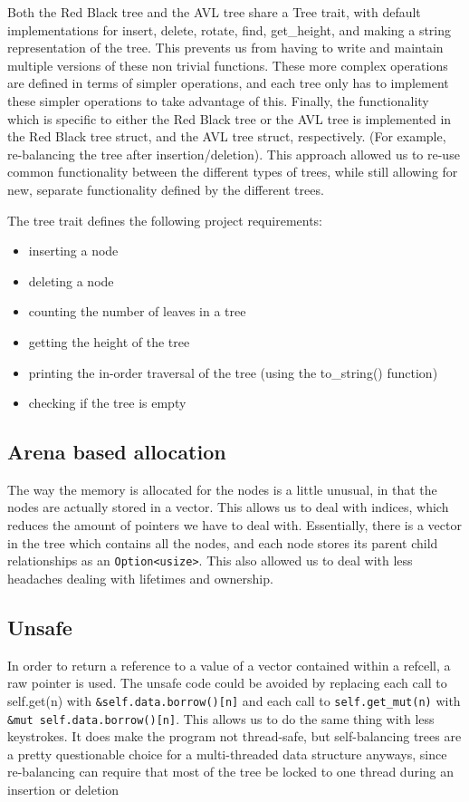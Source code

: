 \documentclass[letterpaper]{article}
\begin{document}
Both the Red Black tree and the AVL tree share a Tree trait, with
default implementations for insert, delete, rotate, find, get\_height,
and making a string representation of the tree. This prevents us from
having to write and maintain multiple versions of these non trivial
functions. These more complex operations are defined in terms of
simpler operations, and each tree only has to implement these simpler
operations to take advantage of this. Finally, the functionality which is
specific to either the Red Black tree or the AVL tree is implemented
in the Red Black tree struct, and the AVL tree struct, respectively.
(For example, re-balancing the tree after insertion/deletion).  This
approach allowed us to re-use common functionality between the
different types of trees, while still allowing for new, separate
functionality defined by the different trees.

The tree trait defines the following project requirements:

\begin{itemize}
  \item inserting a node 
  \item deleting a node
  \item counting the number of leaves in a tree
  \item getting the height of the tree
  \item printing the in-order traversal of the tree (using the to\_string()
    function)
  \item checking if the tree is empty
\end{itemize}

\subsection{Arena based allocation}
The way the memory is allocated for the nodes is a little unusual, in that the
nodes are actually stored in a vector. This allows us to deal with indices,
which reduces the amount of pointers we have to deal with. Essentially, there is
a vector in the tree which contains all the nodes, and each node stores its
parent child relationships as an \texttt{Option<usize>}. This also allowed us to
deal with less headaches dealing with lifetimes and ownership.

\subsection{Unsafe}
In order to return a reference to a value of a vector contained within a
refcell, a raw pointer is used. The unsafe code could be avoided by replacing
each call to self.get(n) with \texttt{\&self.data.borrow()[n]} and each call to
\texttt{self.get\_mut(n)} with \texttt{\&mut self.data.borrow()[n]}. This allows
us to do the same thing with less keystrokes. It does make the program not
thread-safe, but self-balancing trees are a pretty questionable choice for a
multi-threaded data structure anyways, since re-balancing can require that most
of the tree be locked to one thread during an insertion or deletion
\end{document}
